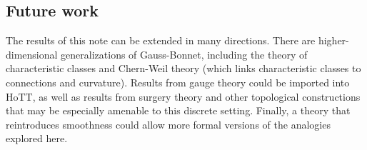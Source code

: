 \subsection{Future work}
The results of this note can be extended in many directions. There are higher-dimensional generalizations of Gauss-Bonnet, including the theory of characteristic classes and Chern-Weil theory (which links characteristic classes to connections and curvature). Results from gauge theory could be imported into HoTT, as well as results from surgery theory and other topological constructions that may be especially amenable to this discrete setting. Finally, a theory that reintroduces smoothness could allow more formal versions of the analogies explored here. 
